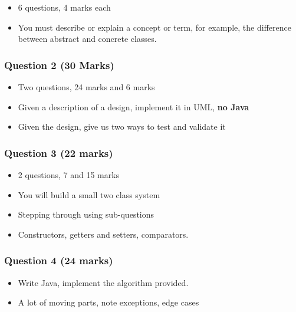 \documentclass[]{article}
\providecommand{\tightlist}{%
  \setlength{\itemsep}{0pt}\setlength{\parskip}{0pt}}
\begin{document}
\begin{itemize}
\tightlist
\item
  6 questions, 4 marks each
\item
  You must describe or explain a concept or term, for example, the
  difference between abstract and concrete classes.
\end{itemize}

\hypertarget{question-2-30-marks}{%
\subsubsection{Question 2 (30 Marks)}\label{question-2-30-marks}}

\begin{itemize}
\item
  Two questions, 24 marks and 6 marks
\item
  Given a description of a design, implement it in UML, \textbf{no Java}
\item
  Given the design, give us two ways to test and validate it
\end{itemize}

\hypertarget{question-3-22-marks}{%
\subsubsection{Question 3 (22 marks)}\label{question-3-22-marks}}

\begin{itemize}
\tightlist
\item
  2 questions, 7 and 15 marks
\item
  You will build a small two class system
\item
  Stepping through using sub-questions
\item
  Constructors, getters and setters, comparators.
\end{itemize}

\hypertarget{question-4-24-marks}{%
\subsubsection{Question 4 (24 marks)}\label{question-4-24-marks}}

\begin{itemize}
\tightlist
\item
  Write Java, implement the algorithm provided.
\item
  A lot of moving parts, note exceptions, edge cases
\end{itemize}
\end{document}
